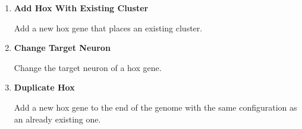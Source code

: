 \begin{enumerate}
	\item \textbf{Add Hox With Existing Cluster}
	
	Add a new hox gene that places an existing cluster.
	
	\item \textbf{Change Target Neuron}
	
	Change the target neuron of a hox gene.
	
	\item \textbf{Duplicate Hox}
	
	Add a new hox gene to the end of the genome with the same configuration as an already existing one.
	
\end{enumerate}
